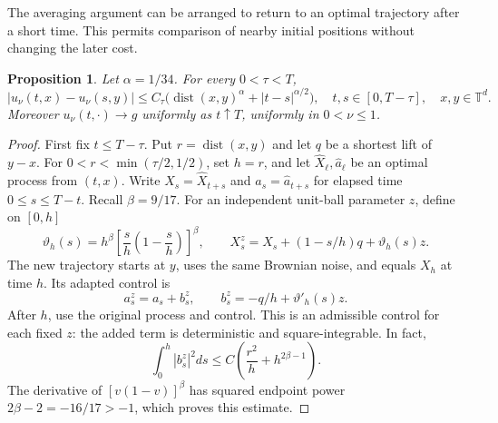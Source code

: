 \documentclass[11pt]{article}
\newcommand{\T}{\mathbb T}
\numberwithin{equation}{section}
\newtheorem{proposition}[theorem]{Proposition}
\begin{document}
The averaging argument can be arranged to return to an optimal trajectory
after a short time. This permits comparison of nearby initial positions
without changing the later cost.

\begin{proposition}\label{prop:modulus}
Let \(\alpha=1/34\). For every \(0<\tau<T\),
\begin{equation}\label{eq:modulus}
 |u_\nu(t,x)-u_\nu(s,y)|
 \le C_\tau\bigl(\operatorname{dist}(x,y)^\alpha
                         +|t-s|^{\alpha/2}\bigr),
 \quad t,s\in[0,T-\tau],\quad x,y\in\T^d .
\end{equation}
Moreover \(u_\nu(t,\cdot)\to g\) uniformly as \(t\uparrow T\),
uniformly in \(0<\nu\le1\).
\end{proposition}

\begin{proof}
First fix \(t\le T-\tau\). Put \(r=\operatorname{dist}(x,y)\) and
let \(q\) be a shortest lift of \(y-x\).
For \(0<r<\min(\tau/2,1/2)\), set \(h=r\), and let
\(\widehat X_\ell,\widehat a_\ell\) be an optimal process from \((t,x)\).
Write \(X_s=\widehat X_{t+s}\) and \(a_s=\widehat a_{t+s}\) for
elapsed time \(0\le s\le T-t\). Recall \(\beta=9/17\).
For an independent unit-ball parameter \(z\), define on \([0,h]\)
\[
 \vartheta_h(s)=h^\beta\left[\frac{s}{h}\left(1-\frac{s}{h}\right)\right]^\beta,
 \qquad
 X_s^z=X_s+(1-s/h)q+\vartheta_h(s)z .
\]
The new trajectory starts at \(y\), uses the same Brownian noise, and
equals \(X_h\) at time \(h\). Its adapted control is
\[
 a_s^z=a_s+b_s^z,\qquad b_s^z=-q/h+\vartheta'_h(s)z.
\]
After \(h\), use the original process and control. This is an admissible
control for each fixed \(z\): the added term is deterministic and
square-integrable. In fact,
\begin{equation}\label{eq:tube-energy}
 \int_0^h|b_s^z|^2ds
       \le C\left(\frac{r^2}{h}+h^{2\beta-1}\right).
\end{equation}
The derivative of \([v(1-v)]^\beta\) has squared endpoint power
\(2\beta-2=-16/17>-1\), which proves this estimate.


\end{proof}
\end{document}
